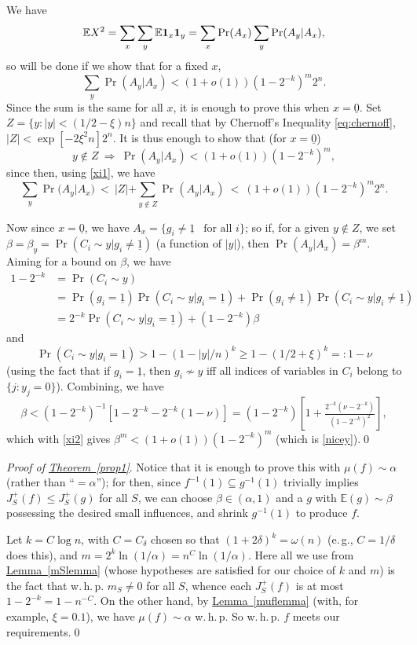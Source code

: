 \documentclass[11pt]{article}
\numberwithin{equation}{section}
\theoremstyle{definition}
\theoremstyle{plain}
\newcommand{\eg}{e.\,g.}
\newcommand{\expref}[2]{\hyperref[#2]{#1~\ref{#2}}}
\newcommand{\one}[0]{{\bf 1}}
\newcommand{\uzero}[0]{\underline{0}}
\newcommand{\uone}[0]{\underline{1}}
\newcommand{\beq}[1]{\begin{equation}\label{#1}}
\newcommand{\enq}[0]{\end{equation}}
\newcommand{\mn}[0]{\medskip\noindent}
\newcommand{\sub}[0]{\subseteq}
\newcommand{\Ra}[0]{\Rightarrow}
\newcommand{\0}[0]{\emptyset}
\newcommand{\ga}[0]{\alpha }
\newcommand{\gb}[0]{\beta }
\newcommand{\gd}[0]{\delta }
\newcommand{\go}[0]{\omega}
\begin{document}
We have
$$
\mathbb E  X^2 = \sum_x\sum_y\mathbb E  \one_x\one_y =\sum_x\Pr(A_x)\sum_y\Pr(A_y|A_x),
$$
so will be done if we show that for a fixed $x$,
$$ 
\sum_y\Pr(A_y|A_x) <(1+o(1)) (1-2^{-k})^m2^n.
$$ 
Since the sum is the same for all $x$, it is enough %
to prove this when $x=\uzero$.
Set $Z=\{y:|y|<(1/2-\xi)n\}$ and recall 
%
that by Chernoff's Inequality \eqref{eq:chernoff}, 
%
%
%
%
$|Z|<\exp[-2\xi^2n]2^n$.
It is thus enough to show that (for $x=\uzero$)
\beq{nicey}
y\not\in Z ~\Ra~\Pr(A_y|A_x)<(1+o(1)) (1-2^{-k})^m,
\enq
since then, using \eqref{xi1}, we have
$$
\sum_y\Pr(A_y|A_x) ~<~ |Z| + \sum_{y\not\in Z}\Pr(A_y|A_x)
~<~ (1+o(1)) (1-2^{-k})^m2^n.
$$


Now since $x=\uzero$, we have
%
$A_x =\{g_i\neq \uone ~~ \text{ for all } i\}$; %
%
%
so 
if, for a given $y\not\in Z$, we set
$\gb =\gb_y=\Pr(C_i\sim y|g_i\neq \uone)$
(a function of $|y|$),
then $\Pr(A_y|A_x) = \gb^m$.
Aiming for a bound on $\gb$, we have
%
\begin{align*}
1-2^{-k}&=\Pr(C_i\sim y) \\
&=
\Pr(g_i=\uone)\Pr(C_i\sim y|g_i=\uone)
+ \Pr(g_i\neq\uone)\Pr(C_i\sim y|g_i\neq \uone)\\
&= 2^{-k}\Pr(C_i\sim y|g_i=\uone) +(1-2^{-k})\gb
\end{align*}
and
$$\Pr(C_i\sim y|g_i=\uone) > 1 - (1-|y|/n)^k
\geq 1-(1/2+\xi)^k=:1-\nu
$$
(using the fact that if
$g_i=\uone$, then $g_i\not\sim y$
iff all indices of
variables in $C_i$ belong to $\{j:y_j=0\}$).
Combining, we have
$$
\gb < (1-2^{-k})^{-1}[1-2^{-k} - 2^{-k}(1-\nu)]
=(1-2^{-k})\left[1+\tfrac{2^{-k}(\nu -2^{-k})}{(1-2^{-k})^2}\right],
$$
which with \eqref{xi2} gives
$\gb^m < (1+o(1))(1-2^{-k})^m$ (which is \eqref{nicey}).\qed

\mn
\emph{Proof of \expref{Theorem}{prop1}}.    %
Notice that it is %
enough to prove this with $\mu(f) \sim \ga$
(rather than ``$=\ga$'');
for then,
since $f^{-1}(1)\sub g^{-1}(1)$ trivially implies
$J_S^+(f)\leq J_S^+(g)$ for all $S$, we can
choose
$\gb\in (\ga,1)$ and a $g$ with $\mathbb E (g)\sim \gb$
possessing the desired small influences, and
shrink $g^{-1}(1)$ to produce $f$.


Let $k=C\log n$, with $C=C_\gd$ chosen so that
$(1+2\gd)^k=\go(n)$ (\eg, $C=1/\gd$ does this),
and
$m = 2^k \ln (1/\ga)=n^C\ln (1/\ga)$.
Here all we use from \expref{Lemma}{mSlemma}
(whose hypotheses are satisfied for our choice of $k$ and $m$)
is the fact that
w.\,h.\,p. $m_S\neq 0$ for all $S$,
whence each $J_S^+(f)$ is at most
$1-2^{-k}=1-n^{-C}$.
On the other hand, by \expref{Lemma}{muflemma}
(with, for example, $\xi=0.1$), we have
$\mu(f) \sim \ga$ w.\,h.\,p.
So w.\,h.\,p. $f$ meets our requirements.\qed
\end{document}
